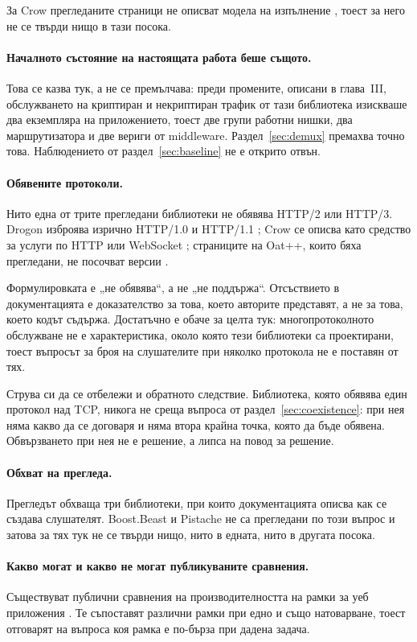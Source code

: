 За Crow прегледаните страници не описват модела на изпълнение \cite{crow, crowssl}, тоест за
него не се твърди нищо в тази посока.

\paragraph{Началното състояние на настоящата работа беше същото.} Това се казва тук, а не се
премълчава: преди промените, описани в глава~III, обслужването на криптиран и некриптиран
трафик от тази библиотека изискваше два екземпляра на приложението, тоест две групи работни
нишки, два маршрутизатора и две вериги от middleware. Раздел~\ref{sec:demux} премахва точно
това. Наблюдението от раздел~\ref{sec:baseline} не е открито отвън.

\paragraph{Обявените протоколи.} Нито една от трите прегледани библиотеки не обявява HTTP/2
или HTTP/3. Drogon изброява изрично HTTP/1.0 и HTTP/1.1 \cite{drogon}; Crow се описва като
средство за услуги по HTTP или WebSocket \cite{crow}; страниците на Oat++, които бяха
прегледани, не посочват версии \cite{oatpp}.

Формулировката е „не обявява“, а не „не поддържа“. Отсъствието в документацията е
доказателство за това, което авторите представят, а не за това, което кодът съдържа.
Достатъчно е обаче за целта тук: многопротоколното обслужване не е характеристика, около
която тези библиотеки са проектирани, тоест въпросът за броя на слушателите при няколко
протокола не е поставян от тях.

Струва си да се отбележи и обратното следствие. Библиотека, която обявява един протокол над
TCP, никога не среща въпроса от раздел~\ref{sec:coexistence}: при нея няма какво да се
договаря и няма втора крайна точка, която да бъде обявена. Обвързването при нея не е решение,
а липса на повод за решение.

\paragraph{Обхват на прегледа.} Прегледът обхваща три библиотеки, при които документацията
описва как се създава слушателят. Boost.Beast \cite{boost_beast} и Pistache \cite{pistache}
не са прегледани по този въпрос и затова за тях тук не се твърди нищо, нито в едната, нито в
другата посока.

\paragraph{Какво могат и какво не могат публикуваните сравнения.} Съществуват публични
сравнения на производителността на рамки за уеб приложения \cite{techempower}. Те съпоставят
различни рамки при едно и също натоварване, тоест отговарят на въпроса коя рамка е по-бърза
при дадена задача.

